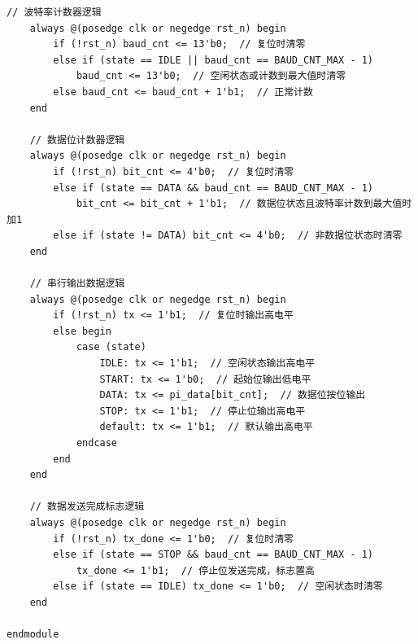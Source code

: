 \documentclass[a4paper,10pt]{article}
\begin{document}
\begin{lstlisting}[caption=uart_tx.v]
    // 波特率计数器逻辑
    always @(posedge clk or negedge rst_n) begin
        if (!rst_n) baud_cnt <= 13'b0;  // 复位时清零
        else if (state == IDLE || baud_cnt == BAUD_CNT_MAX - 1) 
            baud_cnt <= 13'b0;  // 空闲状态或计数到最大值时清零
        else baud_cnt <= baud_cnt + 1'b1;  // 正常计数
    end

    // 数据位计数器逻辑
    always @(posedge clk or negedge rst_n) begin
        if (!rst_n) bit_cnt <= 4'b0;  // 复位时清零
        else if (state == DATA && baud_cnt == BAUD_CNT_MAX - 1) 
            bit_cnt <= bit_cnt + 1'b1;  // 数据位状态且波特率计数到最大值时加1
        else if (state != DATA) bit_cnt <= 4'b0;  // 非数据位状态时清零
    end

    // 串行输出数据逻辑
    always @(posedge clk or negedge rst_n) begin
        if (!rst_n) tx <= 1'b1;  // 复位时输出高电平
        else begin
            case (state)
                IDLE: tx <= 1'b1;  // 空闲状态输出高电平
                START: tx <= 1'b0;  // 起始位输出低电平
                DATA: tx <= pi_data[bit_cnt];  // 数据位按位输出
                STOP: tx <= 1'b1;  // 停止位输出高电平
                default: tx <= 1'b1;  // 默认输出高电平
            endcase
        end
    end

    // 数据发送完成标志逻辑
    always @(posedge clk or negedge rst_n) begin
        if (!rst_n) tx_done <= 1'b0;  // 复位时清零
        else if (state == STOP && baud_cnt == BAUD_CNT_MAX - 1)
            tx_done <= 1'b1;  // 停止位发送完成，标志置高
        else if (state == IDLE) tx_done <= 1'b0;  // 空闲状态时清零
    end

endmodule

\end{lstlisting}
\end{document}
